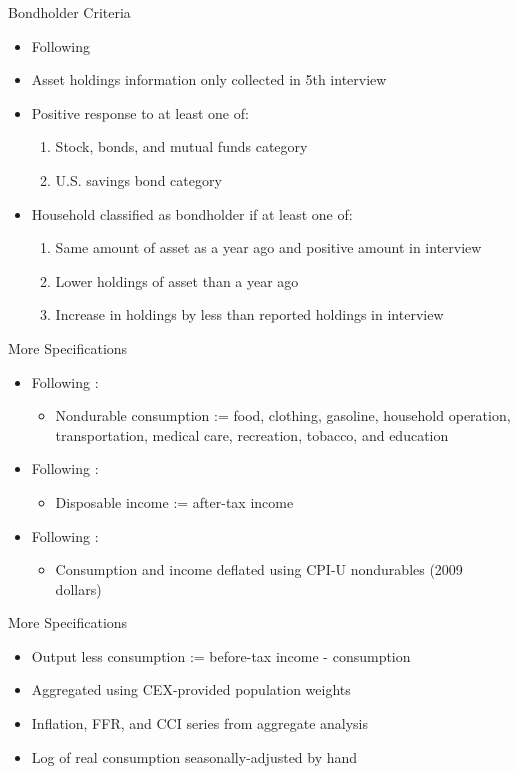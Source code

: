 \documentclass{beamer}
\begin{document}
\begin{frame}{Bondholder Criteria}
\begin{itemize}
\item Following \cite{vissing02}
\item Asset holdings information only collected in 5th interview
\item Positive response to at least one of:
  \begin{enumerate}
  \item Stock, bonds, and mutual funds category
  \item U.S. savings bond category
  \end{enumerate}
\item Household classified as bondholder if at least one of:
  \begin{enumerate}
  \item Same amount of asset as a year ago and positive amount in interview
  \item Lower holdings of asset than a year ago
  \item Increase in holdings by less than reported holdings in interview
  \end{enumerate}
\end{itemize}
\end{frame}

\begin{frame}{More Specifications}
\begin{itemize}
\item Following \cite{heathcote10}:
  \begin{itemize}
  \item Nondurable consumption := food, clothing, gasoline, household operation, transportation, medical care, recreation, tobacco, and education
  \end{itemize}
\item Following \cite{krueger15}:
  \begin{itemize}
  \item Disposable income := after-tax income
  \end{itemize}
\item Following \cite{vissing02}:
  \begin{itemize}
  \item Consumption and income deflated using CPI-U nondurables (2009 dollars)
  \end{itemize}
\end{itemize}
\end{frame}

\begin{frame}{More Specifications}
\begin{itemize}
\item Output less consumption := before-tax income - consumption
\item Aggregated using CEX-provided population weights
\item Inflation, FFR, and CCI series from aggregate analysis
\item Log of real consumption seasonally-adjusted by hand
\end{itemize}
\end{frame}
\end{document}
